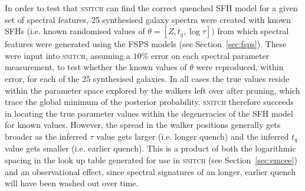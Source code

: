 \documentclass[useAMS,usenatbib]{mn2e}
\begin{document}


In order to test that \textsc{snitch} can find the correct quenched SFH model for a given set of spectral features, 25 synthesised galaxy spectra were created with known SFHs (i.e. known randomised values of $\theta = [Z, t_q, \log \tau]$) from which spectral features were generated using the FSPS models (see Section~\ref{sec:fsps}). These were input into \textsc{snitch}, assuming a $10\%$ error on each spectral parameter measurement, to test whether the known values of $\theta$ were reproduced, within error, for each of the 25 synthesised galaxies. %
In all cases the true values reside within the parameter space explored by the walkers left over after pruning, which trace the global minimum of the posterior probability. \textsc{snitch} therefore succeeds in locating the true parameter values within the degeneracies of the SFH model for known values. However, the spread in the walker positions generally gets broader as the inferred $\tau$ value gets larger (i.e. longer quench) and the inferred $t_q$ value gets smaller (i.e. earlier quench). This is a product of both the logarithmic spacing in the look up table generated for use in \textsc{snitch} (see Section~\ref{sec:emcee}) and an observational effect, since spectral signatures of an longer, earlier quench will have been washed out over time. 
\end{document}
